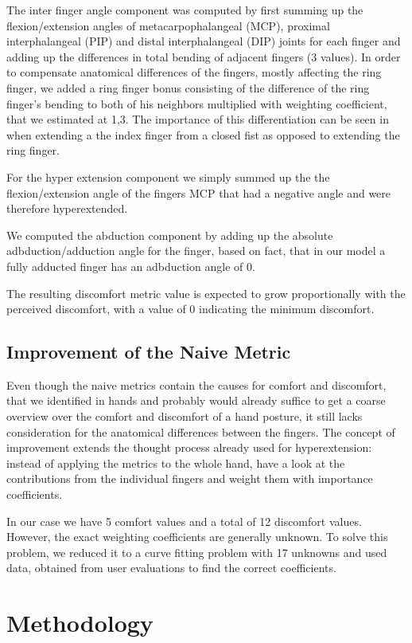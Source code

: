 \documentclass{sig-alternate-05-2015}
\begin{document}
The inter finger angle component was computed by first summing up the flexion/extension angles of metacarpophalangeal (MCP), proximal interphalangeal (PIP) and distal interphalangeal (DIP) joints for each finger and adding up the differences in total bending of adjacent fingers (3 values). In order to compensate anatomical differences of the fingers, mostly affecting the ring finger, we added a ring finger bonus consisting of the difference of the ring finger's bending to both of his neighbors multiplied with weighting coefficient, that we estimated at 1,3. The importance of this differentiation can be seen in when extending a the index finger from a closed fist as opposed to extending the ring finger. 

For the hyper extension component we simply summed up the the flexion/extension angle of the fingers MCP that had a negative angle and were therefore hyperextended.

We computed the abduction component by adding up the absolute adbduction/adduction angle for the finger, based on fact, that in our model a fully adducted finger has an adbduction angle of 0.

The resulting discomfort metric value is expected to grow proportionally with the perceived discomfort, with a value of 0 indicating the minimum discomfort. 

\subsection{Improvement of the Naive Metric}

Even though the naive metrics contain the causes for comfort and discomfort, that we identified in hands and probably would already suffice to get a coarse overview over the comfort and discomfort of a hand posture, it still lacks consideration for the anatomical differences between the fingers.
The concept of improvement extends the thought process already used for hyperextension: instead of applying the metrics to the whole hand, have a look at the contributions from the individual fingers and weight them with importance coefficients. 

In our case we have 5 comfort values and a total of 12 discomfort values. However, the exact weighting coefficients are generally unknown. To solve this problem, we reduced it to a curve fitting problem with 17 unknowns and used data, obtained from user evaluations to find the correct coefficients.

\section{Methodology}
\end{document}
